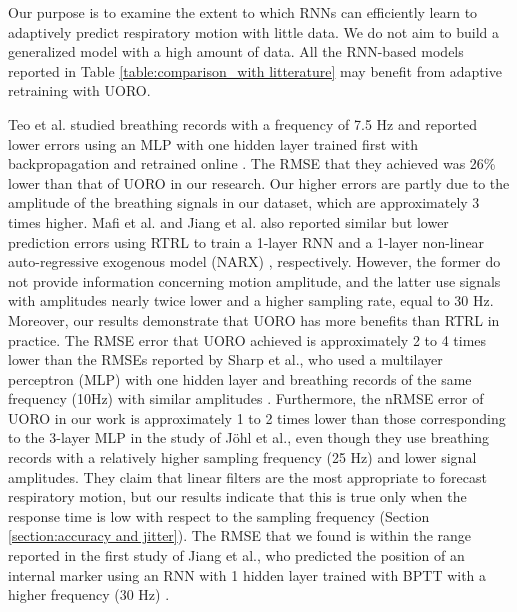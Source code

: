 \documentclass[twocolumn,a4paper]{svjour3} \sloppy          \smartqed
\begin{document}
Our purpose is to examine the extent to which RNNs can efficiently learn to adaptively predict respiratory motion with little data. We do not aim to build a generalized model with a high amount of data. All the RNN-based models reported in Table \ref{table:comparison_with litterature} may benefit from adaptive retraining with UORO.

Teo et al. studied breathing records with a frequency of 7.5 Hz and reported lower errors using an MLP with one hidden layer trained first with backpropagation and retrained online \cite{teo2018feasibility}. The RMSE that they achieved was 26\% lower than that of UORO in our research. Our higher errors are partly due to the amplitude of the breathing signals in our dataset, which are approximately 3 times higher. Mafi et al. and Jiang et al. also reported similar but lower prediction errors using RTRL to train a 1-layer RNN \cite{mafi2020real} and a 1-layer non-linear auto-regressive exogenous model (NARX) \cite{jiang2019prediction}, respectively. However, the former do not provide information concerning motion amplitude, and the latter use signals with amplitudes nearly twice lower and a higher sampling rate, equal to 30 Hz. Moreover, our results demonstrate that UORO has more benefits than RTRL in practice. The RMSE error that UORO achieved is approximately 2 to 4 times lower than the RMSEs reported by Sharp et al., who used a multilayer perceptron (MLP) with one hidden layer and breathing records of the same frequency (10Hz) with similar amplitudes \cite{sharp2004prediction}. Furthermore, the nRMSE error of UORO in our work is approximately 1 to 2 times lower than those corresponding to the 3-layer MLP in the study of Jöhl et al.,  even though they use breathing records with a relatively higher sampling frequency (25 Hz) and lower signal amplitudes. They claim that linear filters are the most appropriate to forecast respiratory motion, but our results indicate that this is true only when the response time is low with respect to the sampling frequency (Section \ref{section:accuracy and jitter}). The RMSE that we found is within the range reported in the first study of Jiang et al., who predicted the position of an internal marker using an RNN with 1 hidden layer trained with BPTT with a higher frequency (30 Hz) \cite{kai2018prediction}. 
\end{document}
